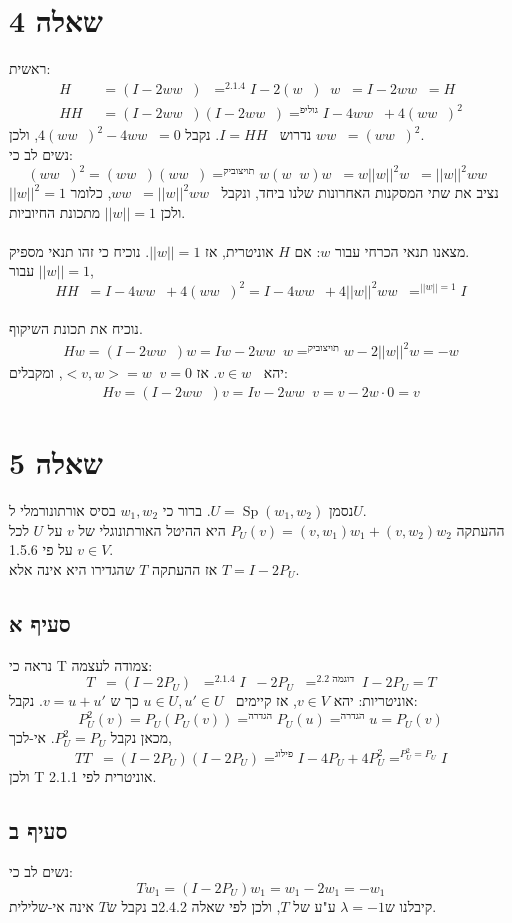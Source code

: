 \documentclass{article}
\DeclareMathOperator*{\equals}{=}
\DeclareMathOperator{\adj}{^\ast}
\DeclareMathOperator{\perc}{^\perp}
\DeclareMathOperator{\Sp}{Sp}
\begin{document}
\pagebreak

\section*{שאלה 4}

ראשית:
\begin{align*}
    H\adj  & = (I-2ww\adj) \adj \equals^{2.1.4}
    I - 2(w \adj) \adj w\adj = I - 2ww\adj = H            \\
    HH\adj & = (I - 2ww\adj)(I - 2ww\adj) \equals^{פילוג}
    I - 4ww\adj + 4 (ww\adj)^2
\end{align*}
נדרוש $I=HH\adj$. נקבל $4(ww\adj)^2 - 4ww\adj=0$, ולכן $ww\adj = (ww\adj)^2$. \\
נשים לב כי:
\[
    (ww\adj)^2=(ww\adj) (w w\adj)\equals^{קיבוציות}w(w\adj w)w\adj=w||w||^2w\adj = ||w||^2 ww\adj
\]
נציב את שתי המסקנות האחרונות שלנו ביחד, ונקבל $ww\adj = ||w||^2ww\adj$, כלומר $||w||^2=1$ ולכן $||w||=1$ מתכונת החיוביות.\\\\
מצאנו תנאי הכרחי עבור $w$: אם $H$ אוניטרית, אז $||w||=1$. נוכיח כי זהו תנאי מספיק.\\
עבור $||w||=1$,
\[
    HH\adj = I - 4ww\adj + 4 (ww\adj)^2=I-4ww\adj + 4||w||^2ww\adj \equals^{||w||=1}I
\]
\\
נוכיח את תכונת השיקוף.
\begin{align*}
    Hw=(I-2ww\adj)w=Iw-2ww\adj w \equals^{קיבוציות} w - 2||w||^2w=-w
\end{align*}
יהא $v\in {w}\perc$. אז $<v,w>=w\adj v = 0$, ומקבלים:
\begin{align*}
    Hv=(I-2ww\adj)v=Iv-2ww\adj v = v - 2w\cdot 0 = v
\end{align*}

\pagebreak

\section*{שאלה 5}

נסמן $U=\Sp({ w_1, w_2 })$. ברור כי ${w_1, w_2}$ בסיס אורתונורמלי ל$U$.\\
ההעתקה $P_U(v)=(v, w_1)w_1+(v,w_2)w_2$ היא ההיטל האורתונוגלי של $v$ על $U$ לכל $v\in V$ על פי 1.5.6.\\
אז ההעתקה $T$ שהגדירו היא אינה אלא $T=I-2P_U$.

\subsection*{סעיף א}
נראה כי T צמודה לעצמה:
\[
    T\adj = (I-2P_U)\adj \equals^{2.1.4}
    I\adj - 2P_U\adj \equals^{2.2\text{ דוגמה }} I-2P_U=T
\]
אוניטריות:
יהא $v\in V$, אז קיימים $u\in U, u'\in U\perc$ כך ש $v=u+u'$. נקבל:
\[
    P_U^2(v)=P_U(P_U(v))\equals^{\text{הגדרה}}P_U(u)\equals^{\text{הגדרה}}u=P_U(v)
\]
מכאן נקבל $P_U^2=P_U$. אי-לכך,
\[
    TT\adj = (I-2P_U)(I-2P_U)\equals^{\text{פילוג}} I - 4P_U + 4P_U^2 \equals^{P_U^2=P_U}I
\]
ולכן T אוניטרית לפי 2.1.1.

\subsection*{סעיף ב}

נשים לב כי:
\[
    Tw_1=(I-2P_U)w_1=w_1-2w_1=-w_1
\]
קיבלנו ש$\lambda=-1$ ע"ע של $T$, ולכן לפי שאלה 2.4.2ב נקבל ש$T$ אינה אי-שלילית.
\end{document}
